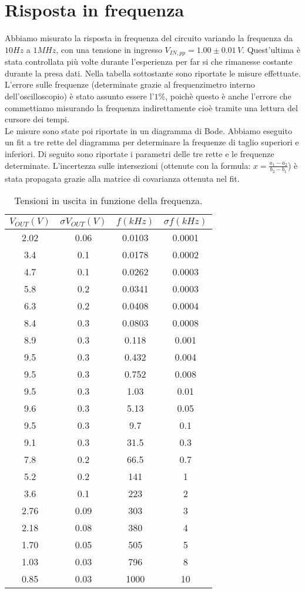 \documentclass[10pt,a4paper]{article}
\begin{document}
\section{Risposta in frequenza}
Abbiamo misurato la risposta in frequenza del circuito variando la frequenza da $10Hz$ a $1MHz$, con una tensione in ingresso $V_{IN,pp}= 1.00 \pm 0.01\, V$. Quest'ultima è stata controllata più volte durante l'esperienza per far si che rimanesse costante durante la presa dati. Nella tabella sottostante sono riportate le misure effettuate. L'errore sulle frequenze (determinate grazie al frequenzimetro interno dell'oscilloscopio) è stato assunto essere l'$1\%$, poichè questo è anche l'errore che commettiamo misurando la frequenza indirettamente cioè tramite una lettura del cursore dei tempi.\\

Le misure sono state poi riportate in un diagramma di Bode. Abbiamo eseguito un fit a tre rette del diagramma per determinare la frequenze di taglio superiori e inferiori. Di seguito sono riportate i parametri delle tre rette e le frequenze determinate. L'incertezza sulle intersezioni (ottenute con la formula: $x = \frac{a_1-a_2}{b_2-b_1}$) è stata propagata grazie alla matrice di covarianza ottenuta nel fit. 

\begin{table}[!htb]\centering
\begin{tabular}{|c|c|c|c|}
\hline
$V_{OUT} (V)$ & $\sigma V_{OUT} (V)$ & $f(kHz)$ & $\sigma f (kHz)$\\
\hline
2.02 & 0.06 & 0.0103 & 0.0001\\
3.4 & 0.1 & 0.0178 & 0.0002\\
4.7 & 0.1 & 0.0262 & 0.0003\\
5.8 & 0.2 & 0.0341 & 0.0003\\
6.3 & 0.2 & 0.0408 & 0.0004\\
8.4 & 0.3 & 0.0803 & 0.0008\\
8.9 & 0.3 & 0.118 & 0.001\\
9.5 & 0.3 & 0.432 & 0.004\\
9.5 & 0.3 & 0.752 & 0.008\\
9.5 & 0.3 & 1.03 & 0.01\\
9.6 & 0.3 & 5.13 & 0.05\\
9.5 & 0.3 & 9.7 & 0.1\\
9.1 & 0.3 & 31.5 & 0.3\\
7.8 & 0.2 & 66.5 & 0.7\\
5.2 & 0.2 & 141 & 1\\
3.6 & 0.1 & 223 & 2\\
2.76 & 0.09 & 303 & 3\\
2.18 & 0.08 & 380 & 4\\
1.70 & 0.05 & 505 & 5\\
1.03 & 0.03 & 796 & 8\\
0.85 & 0.03 & 1000 & 10\\
\hline
\end{tabular}
\caption{Tensioni in uscita in funzione della frequenza.}
\label{bode}
\end{table}
\end{document}
